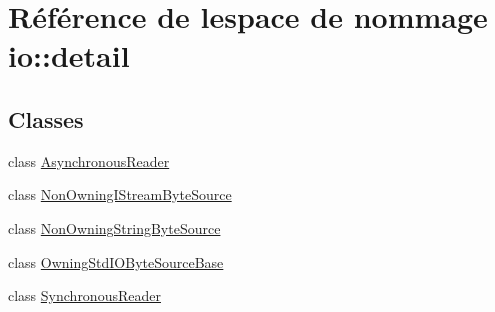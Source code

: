 \hypertarget{namespaceio_1_1detail}{}\section{Référence de l\textquotesingle{}espace de nommage io\+:\+:detail}
\label{namespaceio_1_1detail}
\subsection*{Classes}
\begin{DoxyCompactItemize}
\item 
class \hyperlink{classio_1_1detail_1_1AsynchronousReader}{Asynchronous\+Reader}
\item 
class \hyperlink{classio_1_1detail_1_1NonOwningIStreamByteSource}{Non\+Owning\+I\+Stream\+Byte\+Source}
\item 
class \hyperlink{classio_1_1detail_1_1NonOwningStringByteSource}{Non\+Owning\+String\+Byte\+Source}
\item 
class \hyperlink{classio_1_1detail_1_1OwningStdIOByteSourceBase}{Owning\+Std\+I\+O\+Byte\+Source\+Base}
\item 
class \hyperlink{classio_1_1detail_1_1SynchronousReader}{Synchronous\+Reader}
\end{DoxyCompactItemize}
